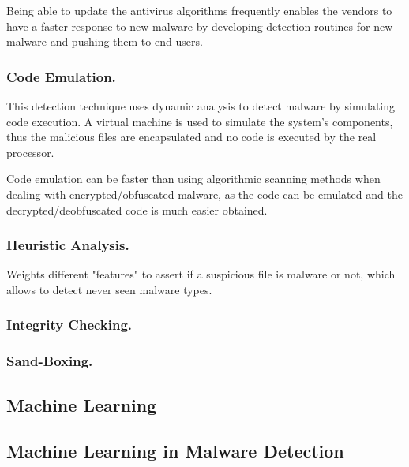 \documentclass{llncs}
\begin{document}
Being able to update the antivirus algorithms frequently enables the vendors to have a faster response to new malware by developing detection routines for new malware and pushing them to end users.

\subsubsection{Code Emulation.} This detection technique uses dynamic analysis to detect malware by simulating code execution. A virtual machine is used to simulate the system's components, thus the malicious files are encapsulated and no code is executed by the real processor.

Code emulation can be faster than using algorithmic scanning methods when dealing with encrypted/obfuscated malware, as the code can be emulated and the decrypted/deobfuscated code is much easier obtained.

\subsubsection{Heuristic Analysis.} Weights different "features" to assert if a suspicious file is malware or not, which allows to detect never seen malware types.

\subsubsection{Integrity Checking.}

\subsubsection{Sand-Boxing.}

\subsection{Machine Learning}

\subsection{Machine Learning in Malware Detection}

\end{document}
